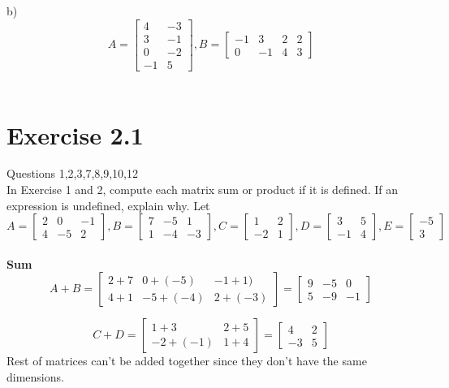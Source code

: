 \documentclass[a4paper]{article}
\begin{document}
b) \[A=
\begin{bmatrix}
4&-3\\
3&-1\\
0&-2\\
-1&5
\end{bmatrix},
B=
\begin{bmatrix}
-1&3&2&2\\
0&-1&4&3
\end{bmatrix}
\]\\

\section{Exercise 2.1}
Questions 1,2,3,7,8,9,10,12\\

In Exercise 1 and 2, compute each matrix sum or product if it is defined. If an expression is undefined, explain why. Let\\
\[A=
\begin{bmatrix}
2&0&-1\\
4&-5&2
\end{bmatrix},
B=
\begin{bmatrix}
7&-5&1\\
1&-4&-3
\end{bmatrix},
C=
\begin{bmatrix}
1&2\\
-2&1
\end{bmatrix},
D=
\begin{bmatrix}
3&5\\
-1&4
\end{bmatrix},
E=
\begin{bmatrix}
-5\\
3
\end{bmatrix}
\]\\

\textbf{Sum}\\
\[A+B =
\begin{bmatrix}
2+7&0+(-5)&-1+1)\\
4+1&-5+(-4)&2+(-3)
\end{bmatrix}=
\begin{bmatrix}
9&-5&0\\
5&-9&-1
\end{bmatrix}
\]

\[C+D =
\begin{bmatrix}
1+3&2+5\\
-2+(-1)&1+4
\end{bmatrix}=
\begin{bmatrix}
4&2\\
-3&5
\end{bmatrix}
\]
Rest of matrices can't be added together since they don't have the same dimensions.\\
\end{document}
